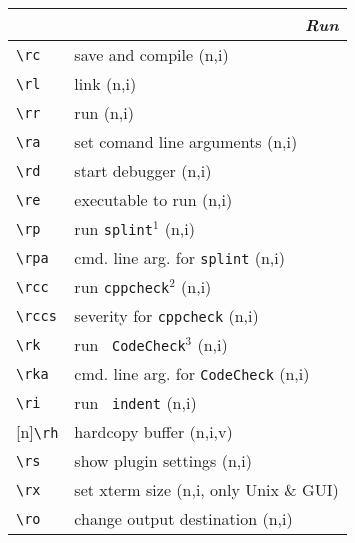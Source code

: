 \documentclass[oneside,11pt,landscape,DIV16]{scrartcl}
\newcommand{\Rep}{{\tiny{[n]}}}
\begin{document}
\begin{multicols}{3}
\begin{center}
%
\vspace{100mm}
\begin{tabular}[]{|p{12mm}|p{58mm}|}
\hline
\multicolumn{2}{|r|}{\textsl{\textbf{R}un}} \\
\hline \verb'\rc'  & save and compile                        \hfill (n,i)\\
\hline \verb'\rl'  & link                                    \hfill (n,i)\\
\hline \verb'\rr'  & run                                     \hfill (n,i)\\
\hline \verb'\ra'  & set comand line arguments               \hfill (n,i)\\
\hline \verb'\rd'  & start debugger                          \hfill (n,i)\\
\hline \verb'\re'  & executable to run                       \hfill (n,i)\\
%
\hline \verb'\rp'  & run \texttt{splint}$^1$                 \hfill (n,i)\\
\hline \verb'\rpa' & cmd. line arg. for \texttt{splint}      \hfill (n,i)\\
%
\hline \verb'\rcc' & run \texttt{cppcheck}$^2$               \hfill (n,i)\\
\hline \verb'\rccs'& severity for \texttt{cppcheck}          \hfill (n,i)\\
%
\hline \verb'\rk'  & run \texttt{ CodeCheck}$^3$             \hfill (n,i)\\
\hline \verb'\rka' & cmd. line arg. for \texttt{CodeCheck}   \hfill (n,i)\\
%
\hline \verb'\ri'  & run \texttt{ indent}        \hfill (n,i)\\
\hline \Rep\verb'\rh'  & hardcopy buffer         \hfill (n,i,v)\\
\hline \verb'\rs'  & show plugin settings        \hfill (n,i)\\
\hline \verb'\rx'  & set xterm size              \hfill (n,i, only Unix \& GUI)\\
\hline \verb'\ro'  & change output destination   \hfill (n,i)\\
\hline 
\end{tabular}

\end{center}
\end{multicols}
\end{document}
